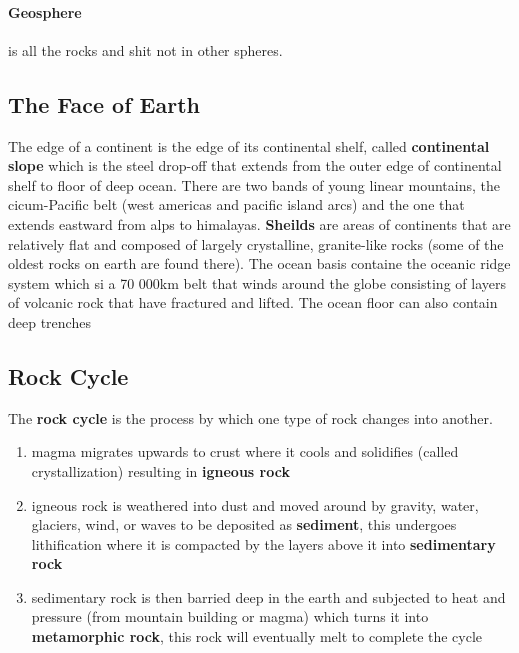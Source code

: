 \documentclass{article}
\begin{document}
\paragraph{Geosphere} is all the rocks and shit not in other spheres.


\subsection*{The Face of Earth} %
\label{sub:the_face_of_earth}
The edge of a continent is the edge of its continental shelf, called \textbf{continental slope} which is the steel drop-off that extends from the outer edge of continental shelf to floor of deep ocean. There are two bands of young linear mountains, the cicum-Pacific belt (west americas and pacific island arcs) and the one that extends eastward from alps to himalayas. \textbf{Sheilds} are areas of continents that are relatively flat and composed of largely crystalline, granite-like rocks (some of the oldest rocks on earth are found there). The ocean basis containe the oceanic ridge system which si a 70 000km belt that winds around the globe consisting of layers of volcanic rock that have fractured and lifted. The ocean floor can also contain deep trenches

\subsection*{Rock Cycle} %
\label{sub:rock_cycle}
The \textbf{rock cycle} is the process by which one type of rock changes into another.

\begin{enumerate}
    \item magma migrates upwards to crust where it cools and solidifies (called crystallization) resulting in \textbf{igneous rock}
    \item igneous rock is weathered into dust and moved around by gravity, water, glaciers, wind, or waves to be deposited as \textbf{sediment}, this undergoes lithification where it is compacted by the layers above it into \textbf{sedimentary rock}
    \item sedimentary rock is then barried deep in the earth and subjected to heat and pressure (from mountain building or magma) which turns it into \textbf{metamorphic rock}, this rock will eventually melt to complete the cycle
\end{enumerate}
\end{document}
